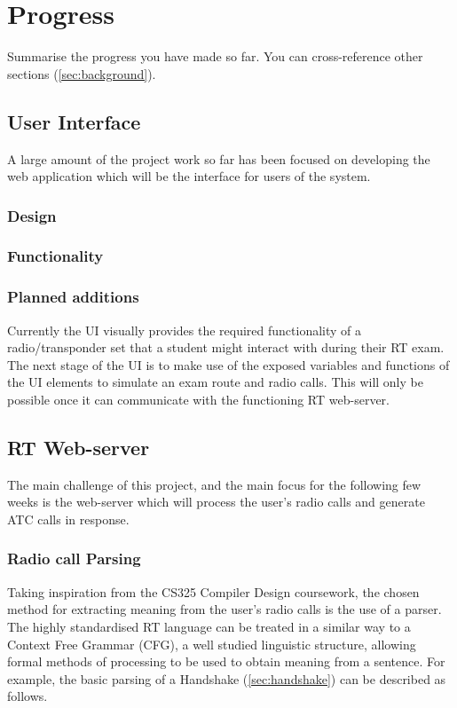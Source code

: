 \section{Progress}
\label{sec:progress}

Summarise the progress you have made so far. You can cross-reference other sections (\ref{sec:background}).

\subsection{User Interface}
A large amount of the project work so far has been focused on developing the web application which will be the interface for users of the system.
\subsubsection{Design}
\subsubsection{Functionality}
\subsubsection{Planned additions}
Currently the UI visually provides the required functionality of a radio/transponder set that a student might interact with during their RT exam. The next stage of the UI is to make use of the exposed variables and functions of the UI elements to simulate an exam route and radio calls. This will only be possible once it can communicate with the functioning RT web-server.

\subsection{RT Web-server}
The main challenge of this project, and the main focus for the following few weeks is the web-server which will process the user's radio calls and generate ATC calls in response.
\subsubsection{Radio call Parsing}
Taking inspiration from the CS325 Compiler Design coursework, the chosen method for extracting meaning from the user's radio calls is the use of a parser. The highly standardised RT language can be treated in a similar way to a Context Free Grammar (CFG), a well studied linguistic structure, allowing formal methods of processing to be used to obtain meaning from a sentence. For example, the basic parsing of a Handshake (\ref{sec:handshake}) can be described as follows.

